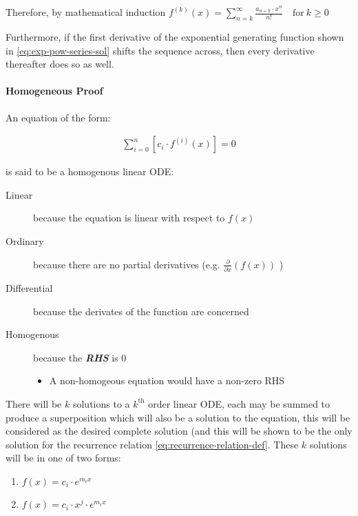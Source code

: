 \documentclass[11pt]{article}
\begin{document}
Therefore, by mathematical induction \(f^{(k)}\left(x\right) = \sum_{n=k}^\infty\frac{a_{n+k}\cdot x^n}{n!} \quad \text{for}~k \ge 0\)

Furthermore, if the first derivative of the exponential generating function shown in \eqref{eq:exp-pow-series-sol}
shifts the sequence across, then every derivative thereafter does so as well.

\paragraph{Homogeneous Proof}
\label{sec:org71f107b}
An equation of the form:

\begin{align}
\sum^{n}_{i=0} \left[ c_{i} \cdot f^{(i)}(x) \right] = 0 \label{eq:hom-ode}
\end{align}

is said to be a homogenous linear ODE: \cite[Ch. 2]{zillDifferentialEquations2009a}

\begin{description}
\item[{Linear}] because the equation is linear with respect to \(f(x)\)
\item[{Ordinary}] because there are no partial derivatives (e.g. \(\frac{\partial }{\partial x}{\left({ f{\left({ x }\right)} }\right)}\)  )
\item[{Differential}] because the derivates of the function are concerned
\item[{Homogenous}] because the \textbf{\emph{RHS}} is 0
\begin{itemize}
\item A non-homogeous equation would have a non-zero RHS
\end{itemize}
\end{description}

There will be \(k\) solutions to a \(k^{\mathrm{th}}\) order linear ODE, each may be summed to produce a superposition which will also be a solution to the equation, \cite[Ch. 4]{zillDifferentialEquations2009a}  this will be considered as the desired complete solution (and this will be shown to be the only solution for the recurrence relation \eqref{eq:recurrence-relation-def}. These \(k\) solutions will be in one of two forms:

\begin{enumerate}
\item \(f(x)=c_{i} \cdot e^{m_{i}x}\)
\item \(f(x)=c_{i} \cdot x^{j}\cdot e^{m_{i}x}\)
\end{enumerate}
\end{document}
